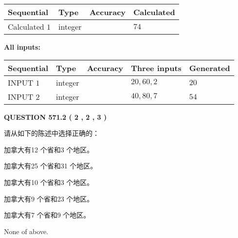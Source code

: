 \documentclass{ctexart}
\begin{document}
   
   
   
\noindent{}
   
   
  
  
\noindent\begin{tabular}{|l|l|l|l|}
\hline
 Sequential & Type & Accuracy & Calculated \\ 
\hline
 
 
  Calculated $  1 $ & integer &  & 
  $ 74 $ 
 \\  \hline  
 \end{tabular}
   
   
   
   
\noindent\vspace{0.1in}\hspace{-0.08in} {\textbf{\Large{All inputs: }}}
   
   
  
  
\noindent\begin{tabular}{|l|l|l|l|l|}
\hline
 Sequential & Type & Accuracy & Three inputs & Generated \\ 
\hline
 
 
  INPUT $  1 $ & integer &  & $
 20
 , 
 60
 , 
 2
 $ & $ 20 $ 
 \\  \hline  
 
 
  INPUT $  2 $ & integer &  & $
 40
 , 
 80
 , 
 7
 $ & $ 54 $ 
 \\  \hline  
 \end{tabular}
   
   
  
\vspace{0.2in}
  
{\textbf{\Large{QUESTION
571.2 
 ( 2 , 2 , 3 )
}}}
  
  
请从如下的陈述中选择正确的：
 
 
加拿大有12 个省和3 个地区。
 
 
加拿大有25 个省和31 个地区。
 
 
加拿大有10 个省和3 个地区。
 
 
加拿大有9 个省和23 个地区。
 
 
加拿大有7 个省和9 个地区。
 
 
 None of above.
 
 
\noindent{}
 
\end{document}
